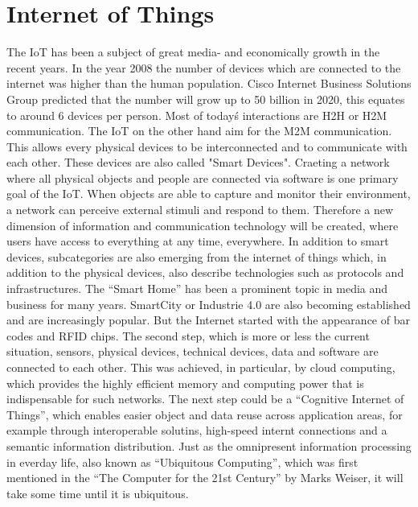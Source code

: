 \section{Internet of Things}
The \ac{IoT} has been a subject of great media- and economically growth in the recent years.
In the year 2008 the number of devices which are connected to the internet was higher than the human population.\cite{Eva11}
Cisco Internet Business Solutions Group predicted that the number will grow up to 50 billion in 2020, this equates to around 6 devices per person.\cite{Eva11}
Most of today\'s interactions are \ac{H2H} or \ac{H2M} communication.
The \ac{IoT} on the other hand aim for the \ac{M2M} communication.
This allows every physical devices to be interconnected and to communicate with each other.
These devices are also called "Smart Devices".
Craeting a network where all physical objects and people are connected via software is one primary goal of the \ac{IoT}.\cite{Rui2015}\cite{Kra13}
When objects are able to capture and monitor their environment, a network can perceive external stimuli and respond to them.\cite[p. 40]{Itu11}
Therefore a new dimension of information and communication technology will be created, where users have access to everything at any time, everywhere.
In addition to smart devices, subcategories are also emerging from the internet of things which, in addition to the physical devices, also describe technologies such as protocols and infrastructures.
The "`Smart Home"' has been a prominent topic in media and business for many years.
SmartCity or Industrie 4.0 are also becoming established and are increasingly popular.
But the Internet started with the appearance of bar codes and \ac{RFID} chips.\cite{Kra13}
The second step, which is more or less the current situation, sensors, physical devices, technical devices, data and software are connected to each other.\cite{Kra13}
This was achieved, in particular, by cloud computing, which provides the highly efficient memory and computing power that is indispensable for such networks.\cite{Rui2015}
The next step could be a "`Cognitive Internet of Things"', which enables easier object and data reuse across application areas, for example through interoperable solutins, high-speed internt connections and a semantic information distribution.\cite{Kra13}
Just as the omnipresent information processing in everday life, also known as "`Ubiquitous Computing"', which was first mentioned in the "`The Computer for the 21st Century"'\cite{Wei91} by Marks Weiser, it will take some time until it is ubiquitous.


